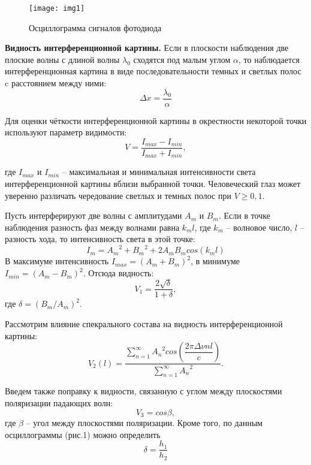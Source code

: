 \documentclass{letask}
\begin{document}
\begin{figure}
	\texttt{[image: img1]}
	\caption{Осциллограмма сигналов фотодиода}
	\label{fig:somelabel}
\end{figure}

\textbf{Видность интерференционной картины.} Если в плоскости наблюдения две плоские волны с длиной волны $\lambda_{0}$ сходятся под малым углом $\alpha$, то наблюдается интерференционная картина в виде последовательности темных и светлых полос c расстоянием между ними:
\begin{equation}
\label{eq:deltax}
\Delta x = \dfrac{\lambda_{0}}{\alpha}
\end{equation}

Для оценки чёткости интерференционной картины в окрестности некоторой точки используют параметр видимости:
\begin{equation}
\label{eq:seen}
V=\dfrac{I_{max}-I_{min}}{I_{max}+I_{min}},
\end{equation}

где $I_{max}$ и $I_{min}$ -- максимальная и минимальная интенсивности света интерференционной картины вблизи выбранной точки. Человеческий глаз может уверенно различать чередование светлых и темных полос при $V \geq 0,1$. 

Пусть интерферируют две волны с амплитудами $A_{m}$ и $B_{m}$. Если в точке наблюдения разность фаз между волнами равна $k_{m} l$, где $k_{m}$ -- волновое число, $l$ -- разность хода, то интенсивность света в этой точке:
\begin{equation}
\label{eq:intensity}
I_{m} = {A_{m}}^2+{B_{m}}^2+2 A_{m} B_{m} cos(k_{m}l)
\end{equation} 
В максимуме интенсивность $I_{max} = (A_{m}+B_{m})^2$, в минимуме $I_{min} = (A_{m}-B_{m})^2.$ Отсюда видность:
\begin{equation}
\label{eq:seen1}
V_{1} = \dfrac{2 \sqrt{\delta}}{1+\delta},
\end{equation}
где $\delta = (B_{m}/A_{m})^2$.

Рассмотрим влияние спекрального состава на видность интерференционной картины:
\begin{equation}
V_{2}(l) = \dfrac{\sum_{n=1}^{\infty} {A_{n}}^2 cos(\dfrac{2 \pi \Delta \nu n l}{c})}{\sum_{n=1}^{\infty}{A_{n}}^2}.
\end{equation}

Введем также поправку к видности, связанную с углом между плоскостями поляризации падающих волн:
\begin{equation}
V_{3} = cos \beta,
\end{equation}
где $\beta$ -- угол между плоскостями поляризации.
Кроме того, по данным осциллограммы (рис.1) можно определить
\begin{equation}
\delta = \dfrac{h_{1}}{h_{2}}
\end{equation}
\end{document}
